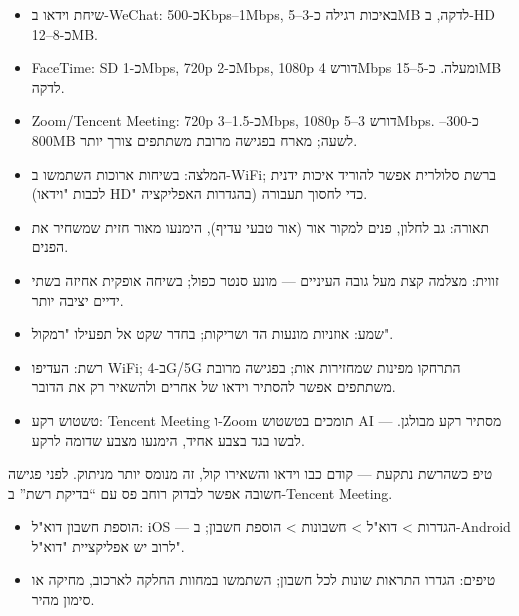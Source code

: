
\begin{itemize}
  \item שיחת וידאו ב-WeChat: כ-500Kbps–1Mbps, באיכות רגילה כ-3–5MB לדקה, ב-HD כ-8–12MB.
  \item FaceTime: SD כ-1Mbps, 720p כ-2Mbps, 1080p דורש 4Mbps ומעלה. כ-5–15MB לדקה.
  \item Zoom/Tencent Meeting: 720p כ-1.5–3Mbps, 1080p דורש 3–5Mbps. כ-300–800MB לשעה; מארח בפגישה מרובת משתתפים צורך יותר.
  \item המלצה: בשיחות ארוכות השתמשו ב-WiFi; ברשת סלולרית אפשר להוריד איכות ידנית (לכבות "וידאו HD" בהגדרות האפליקציה) כדי לחסוך תעבורה.
\end{itemize}


\begin{itemize}
  \item תאורה: גב לחלון, פנים למקור אור (אור טבעי עדיף), הימנעו מאור חזית שמשחיר את הפנים.
  \item זווית: מצלמה קצת מעל גובה העיניים — מונע סנטר כפול; בשיחה אופקית אחיזה בשתי ידיים יציבה יותר.
  \item שמע: אוזניות מונעות הד ושריקות; בחדר שקט אל תפעילו "רמקול".
  \item רשת: העדיפו WiFi; ב-4G/5G התרחקו מפינות שמחזירות אות; בפגישה מרובת משתתפים אפשר להסתיר וידאו של אחרים ולהשאיר רק את הדובר.
  \item טשטוש רקע: Tencent Meeting ו-Zoom תומכים בטשטוש AI — מסתיר רקע מבולגן. לבשו בגד בצבע אחיד, הימנעו מצבע שדומה לרקע.
\end{itemize}

\begin{tcbinfo}{טיפ}
כשהרשת נתקעת — קודם כבו וידאו והשאירו קול, זה מנומס יותר מניתוק. לפני פגישה חשובה אפשר לבדוק רוחב פס עם “בדיקת רשת” ב-Tencent Meeting.

\end{tcbinfo}


\begin{itemize}
  \item הוספת חשבון דוא"ל: iOS — הגדרות > דוא"ל > חשבונות > הוספת חשבון; ב-Android לרוב יש אפליקציית "דוא"ל".
  \item טיפים: הגדרו התראות שונות לכל חשבון; השתמשו במחוות החלקה לארכוב, מחיקה או סימון מהיר.
\end{itemize}

